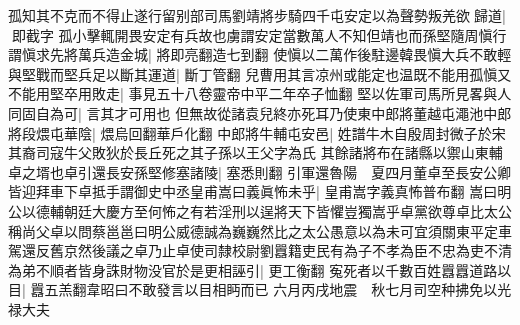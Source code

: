 孤知其不克而不得止遂行留别部司馬劉靖將步騎四千屯安定以為聲勢叛羌欲歸道|{
	即截字}
孤小擊輒開畏安定有兵故也虜謂安定當數萬人不知但靖也而孫堅隨周愼行謂愼求先將萬兵造金城|{
	將即亮翻造七到翻}
使愼以二萬作後駐邊韓畏愼大兵不敢輕與堅戰而堅兵足以斷其運道|{
	斷丁管翻}
兒曹用其言凉州或能定也温既不能用孤愼又不能用堅卒用敗走|{
	事見五十八卷靈帝中平二年卒子恤翻}
堅以佐軍司馬所見畧與人同固自為可|{
	言其才可用也}
但無故從諸袁兒終亦死耳乃使東中郎將董越屯澠池中郎將段煨屯華陰|{
	煨烏回翻華戶化翻}
中郎將牛輔屯安邑|{
	姓譜牛木自殷周封微子於宋其裔司寇牛父敗狄於長丘死之其子孫以王父字為氏}
其餘諸將布在諸縣以禦山東輔卓之壻也卓引還長安孫堅修塞諸陵|{
	塞悉則翻}
引軍還魯陽　夏四月董卓至長安公卿皆迎拜車下卓抵手謂御史中丞皇甫嵩曰義眞怖未乎|{
	皇甫嵩字義真怖普布翻}
嵩曰明公以德輔朝廷大慶方至何怖之有若淫刑以逞將天下皆懼豈獨嵩乎卓黨欲尊卓比太公稱尚父卓以問蔡邕邕曰明公威德誠為巍巍然比之太公愚意以為未可宜須關東平定車駕還反舊京然後議之卓乃止卓使司隸校尉劉囂籍吏民有為子不孝為臣不忠為吏不清為弟不順者皆身誅財物没官於是更相誣引|{
	更工衡翻}
寃死者以千數百姓囂囂道路以目|{
	囂五羔翻韋昭曰不敢發言以目相眄而已}
六月丙戌地震　秋七月司空种拂免以光禄大夫

